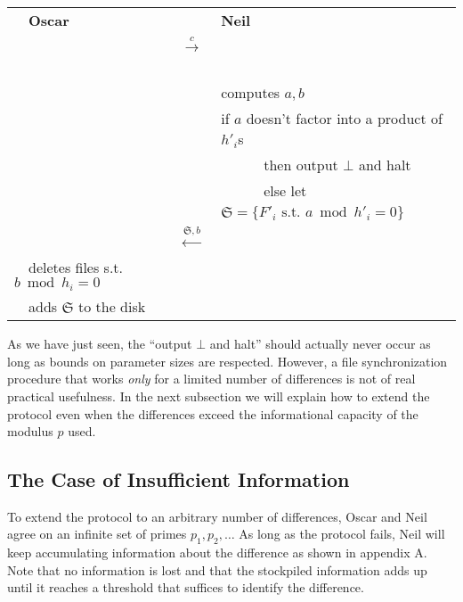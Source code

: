 \documentclass[11pt]{llncs}
\begin{document}
\begin{center}
\begin{tabular}{|lcl|}\hline
~~{\bf Oscar}                       &                                                      &   {\bf Neil}~\\
                                   &~~{{\LARGE $\stackrel{c}{\longrightarrow}$}}~~        &   \\
                                   &                                                      &computes $a,b$~\\
                                   &                                                      &if $a$ doesn't factor into a product of $h'_i$s~\\
                                   &                                                      &~~~~~~then output $\bot$ and halt~\\
                                   &                                                      &~~~~~~else let $\mathfrak{S}=\{F'_i \mbox{~s.t.~} a \bmod h'_i =0\}$~~\\
                                   &~~{\LARGE $\stackrel{\mathfrak{S},b}{\longleftarrow}$}&\\
~~deletes files s.t. $b \bmod h_i =0$&                                                      &\\
~~adds $\mathfrak{S}$ to the disk    &                                                      &\\\hline
\end{tabular}
\end{center}

As we have just seen, the ``output $\bot$ and halt'' should actually never occur as long as bounds on parameter sizes are respected. However, a file synchronization procedure that works {\sl only} for a limited number of differences is not of real practical usefulness. In the next subsection we will explain how to extend the protocol even when the differences exceed the informational capacity of the modulus $p$ used.

\subsection{The Case of Insufficient Information}

To extend the protocol to an arbitrary number of differences, Oscar and Neil agree on an infinite set of primes $p_1,p_2,\ldots$ As long as the protocol fails, Neil will keep accumulating information about the difference as shown in appendix A. Note that no information is lost and that the stockpiled information adds up until it reaches a threshold that suffices to identify the difference.\smallskip
\end{document}
